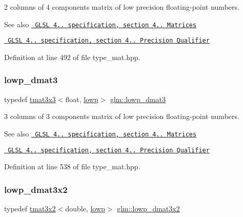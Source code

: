 2 columns of 4 components matrix of low precision floating-\/point numbers.

\begin{DoxySeeAlso}{See also}
\href{http://www.opengl.org/registry/doc/GLSLangSpec.4.20.8.pdf}{\texttt{ G\+L\+SL 4.. specification, section 4.. Matrices}} 

\href{http://www.opengl.org/registry/doc/GLSLangSpec.4.20.8.pdf}{\texttt{ G\+L\+SL 4.. specification, section 4.. Precision Qualifier}} 
\end{DoxySeeAlso}


Definition at line 492 of file type\+\_\+mat.\+hpp.

\mbox{\label{group__core__precision_ga2a63ac35bb66e49374db9f699bef9597}} 
\subsubsection{\texorpdfstring{lowp\_dmat3}{lowp\_dmat3}}
{\footnotesize\ttfamily typedef \mbox{\hyperlink{structglm_1_1tmat3x3}{tmat3x3}}$<$float, \mbox{\hyperlink{namespaceglm_a0f04f086094c747d227af4425893f545ae161af3fc695e696ce3bf69f7332bc2d}{lowp}}$>$ \mbox{\hyperlink{group__core__precision_ga2a63ac35bb66e49374db9f699bef9597}{glm\+::lowp\+\_\+dmat3}}}

3 columns of 3 components matrix of low precision floating-\/point numbers.

\begin{DoxySeeAlso}{See also}
\href{http://www.opengl.org/registry/doc/GLSLangSpec.4.20.8.pdf}{\texttt{ G\+L\+SL 4.. specification, section 4.. Matrices}} 

\href{http://www.opengl.org/registry/doc/GLSLangSpec.4.20.8.pdf}{\texttt{ G\+L\+SL 4.. specification, section 4.. Precision Qualifier}} 
\end{DoxySeeAlso}


Definition at line 538 of file type\+\_\+mat.\+hpp.

\mbox{\label{group__core__precision_gac90dba962673ae315e5504a362d39b1c}} 
\subsubsection{\texorpdfstring{lowp\_dmat3x2}{lowp\_dmat3x2}}
{\footnotesize\ttfamily typedef \mbox{\hyperlink{structglm_1_1tmat3x2}{tmat3x2}}$<$double, \mbox{\hyperlink{namespaceglm_a0f04f086094c747d227af4425893f545ae161af3fc695e696ce3bf69f7332bc2d}{lowp}}$>$ \mbox{\hyperlink{group__core__precision_gac90dba962673ae315e5504a362d39b1c}{glm\+::lowp\+\_\+dmat3x2}}}


